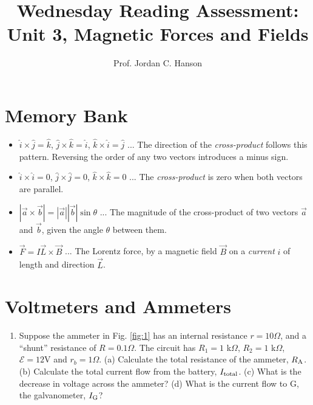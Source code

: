 \documentclass{article}
\begin{document}
\twocolumn

\title{Wednesday Reading Assessment: Unit 3, Magnetic Forces and Fields}
\author{Prof. Jordan C. Hanson}

\maketitle

\section{Memory Bank}

\begin{itemize}
\item $\hat{i} \times \hat{j} = \hat{k}$, $\hat{j} \times \hat{k} = \hat{i}$, $\hat{k} \times \hat{i} = \hat{j}$ ... The direction of the \textit{cross-product} follows this pattern.  Reversing the order of any two vectors introduces a minus sign.
\item $\hat{i} \times \hat{i} = 0$, $\hat{j} \times \hat{j} = 0$, $\hat{k} \times \hat{k} = 0$ ... The \textit{cross-product} is zero when both vectors are parallel.
\item $|\vec{a} \times \vec{b}| = |\vec{a}||\vec{b}|\sin\theta$ ... The magnitude of the cross-product of two vectors $\vec{a}$ and $\vec{b}$, given the angle $\theta$ between them.
\item $\vec{F} = I\vec{L} \times \vec{B}$ ... The Lorentz force, by a magnetic field $\vec{B}$ on a \textit{current} $i$ of length and direction $\vec{L}$.
\end{itemize}

\section{Voltmeters and Ammeters}

\begin{enumerate}
\item Suppose the ammeter in Fig. \ref{fig:1} has an internal resistance $r = 10\Omega$, and a ``shunt'' resistance of $R = 0.1\Omega$.  The circuit has $R_1 = 1$ k$\Omega$, $R_2 = 1$ k$\Omega$, $\mathcal{E} = 12$V and $r_b = 1 \Omega$. (a) Calculate the total resistance of the ammeter, $R_{\rm A}$. (b) Calculate the total current flow from the battery, $I_{\rm total}$. (c) What is the decrease in voltage across the ammeter? (d) What is the current flow to G, the galvanometer, $I_{\rm G}$? \\ \vspace{3cm}
\end{enumerate}
\end{document}
